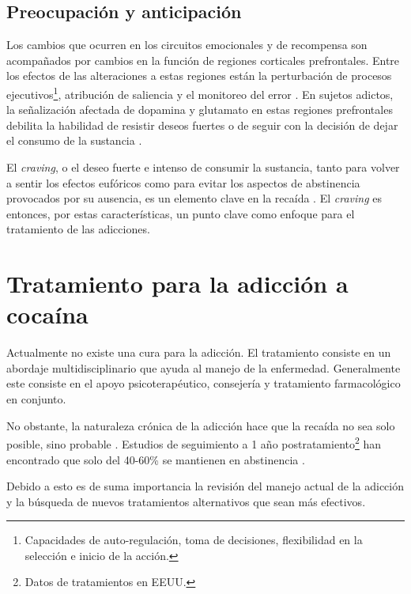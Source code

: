 \subsection{Preocupación y anticipación}
\label{crav}
Los cambios que ocurren en los circuitos emocionales y de recompensa son acompañados por cambios en la función de regiones corticales prefrontales.
Entre los efectos de las alteraciones a estas regiones están la perturbación de procesos ejecutivos\footnote{Capacidades de auto-regulación, toma de decisiones, flexibilidad en la selección e inicio de la acción.}, atribución de saliencia y el monitoreo del error \parencite{Goldstein2012a,Volkow2016}.
En sujetos adictos, la señalización afectada de dopamina y glutamato en estas regiones prefrontales debilita la habilidad de resistir deseos fuertes o de seguir con la decisión de dejar el consumo de la sustancia \parencite{Volkow2016}.\par
El \textit{craving}, o el deseo fuerte e intenso de consumir la sustancia, tanto para volver a sentir los efectos eufóricos como para evitar los aspectos de abstinencia provocados por su ausencia, es un elemento clave en la recaída \parencite{Koob2010a}.
El \textit{craving} es entonces, por estas características, un punto clave como enfoque para el tratamiento de las adicciones.

\section{Tratamiento para la adicción a cocaína}
Actualmente no existe una cura para la adicción.
El tratamiento consiste en un abordaje multidisciplinario que ayuda al manejo de la enfermedad.
Generalmente este consiste en el apoyo psicoterapéutico, consejería y tratamiento farmacológico en conjunto. \par
No obstante, la naturaleza crónica de la adicción hace que la recaída no sea solo posible, sino probable \parencite{NIDA.}.
Estudios de seguimiento a 1 año postratamiento\footnote{Datos de tratamientos en EEUU.} han encontrado que solo del 40-60\% se mantienen en abstinencia \parencite{McLellan2000a}.\par
Debido a esto es de suma importancia la revisión del manejo actual de la adicción y la búsqueda de nuevos tratamientos alternativos que sean más efectivos.

